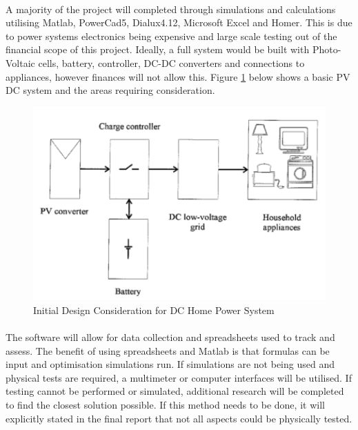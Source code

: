 \paragraph{}
A majority of the project will completed through simulations and calculations utilising Matlab, PowerCad5, Dialux4.12, Microsoft Excel and Homer. This is due to power systems electronics being expensive and large scale testing out of the financial scope of this project. Ideally, a full system would be built with Photo-Voltaic cells, battery, controller, DC-DC converters and connections to appliances, however finances will not allow this. Figure \ref{fig:DCHomeSystem} below shows a basic PV DC system and the areas requiring consideration. 

\begin{figure}[H]
\hfill\includegraphics[width = 120mm]{images/DC_Home}\hspace*{\fill}
\caption{Initial Design Consideration for DC Home Power System \cite{Pellis1997}} 
\label{fig:DCHomeSystem}
\end{figure} 

\paragraph{} 
The software will allow for data collection and spreadsheets used to track and assess. The benefit of using spreadsheets and Matlab is that formulas can be input and optimisation simulations run. If simulations are not being used and physical tests are required, a multimeter or computer interfaces will be utilised. If testing cannot be performed or simulated, additional research will be completed to find the closest solution possible. If this method needs to be done, it will explicitly stated in the final report that not all aspects could be physically tested.     

